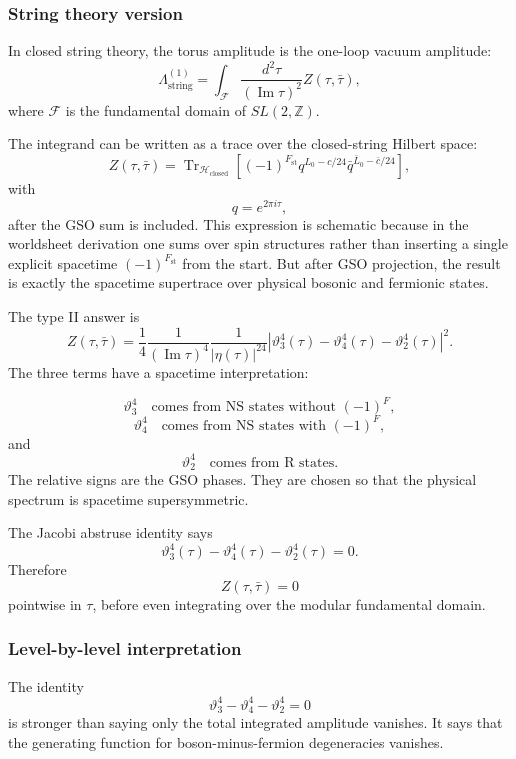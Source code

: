 \documentclass[
  10pt,
  a4paper,
  openany]{book}
\begin{document}
\subsubsection{String theory version}\label{string-theory-version}

In closed string theory, the torus amplitude is the one-loop vacuum
amplitude: \[
\Lambda_{\mathrm{string}}^{(1)}
=
\int_{\mathcal F}
\frac{d^2\tau}{(\operatorname{Im}\tau)^2}
Z(\tau,\bar\tau),
\] where \(\mathcal F\) is the fundamental domain of
\(SL(2,\mathbb Z)\).

The integrand can be written as a trace over the closed-string Hilbert
space: \[
Z(\tau,\bar\tau)
=
\operatorname{Tr}_{\mathcal H_{\mathrm{closed}}}
\left[
(-1)^{F_{\mathrm{st}}}
q^{L_0-c/24}
\bar q^{\bar L_0-\bar c/24}
\right],
\] with \[
q=e^{2\pi i\tau},
\] after the GSO sum is included. This expression is schematic because
in the worldsheet derivation one sums over spin structures rather than
inserting a single explicit spacetime \((-1)^{F_{\mathrm{st}}}\) from
the start. But after GSO projection, the result is exactly the spacetime
supertrace over physical bosonic and fermionic states.

The type II answer is \[
Z(\tau,\bar\tau)
=
\frac{1}{4}
\frac{1}{(\operatorname{Im}\tau)^4}
\frac{1}{|\eta(\tau)|^{24}}
\left|
\vartheta_3^4(\tau)
-
\vartheta_4^4(\tau)
-
\vartheta_2^4(\tau)
\right|^2.
\] The three terms have a spacetime interpretation:

\[
\vartheta_3^4
\quad\text{comes from NS states without }(-1)^F,
\] \[
\vartheta_4^4
\quad\text{comes from NS states with }(-1)^F,
\] and \[
\vartheta_2^4
\quad\text{comes from R states}.
\] The relative signs are the GSO phases. They are chosen so that the
physical spectrum is spacetime supersymmetric.

The Jacobi abstruse identity says \[
\vartheta_3^4(\tau)
-
\vartheta_4^4(\tau)
-
\vartheta_2^4(\tau)
=
0.
\] Therefore \[
Z(\tau,\bar\tau)=0
\] pointwise in \(\tau\), before even integrating over the modular
fundamental domain.

\subsubsection{Level-by-level
interpretation}\label{level-by-level-interpretation}

The identity \[
\vartheta_3^4-\vartheta_4^4-\vartheta_2^4=0
\] is stronger than saying only the total integrated amplitude vanishes.
It says that the generating function for boson-minus-fermion
degeneracies vanishes.
\end{document}
